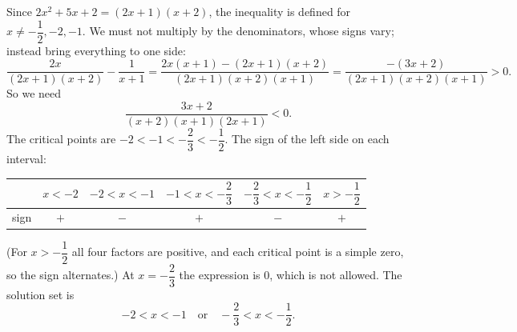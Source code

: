 Since $2x^2+5x+2=(2x+1)(x+2)$, the inequality is defined for $x\ne-\dfrac12,-2,-1$. We must not multiply by the denominators, whose signs vary; instead bring everything to one side:
\[\dfrac{2x}{(2x+1)(x+2)}-\dfrac1{x+1}=\dfrac{2x(x+1)-(2x+1)(x+2)}{(2x+1)(x+2)(x+1)}=\dfrac{-(3x+2)}{(2x+1)(x+2)(x+1)}>0.\]
So we need
\[\dfrac{3x+2}{(x+2)(x+1)(2x+1)}<0.\]
The critical points are $-2<-1<-\dfrac23<-\dfrac12$. The sign of the left side on each interval:
\begin{center}
\begin{tabular}{c|c|c|c|c|c}
& $x<-2$ & $-2<x<-1$ & $-1<x<-\dfrac23$ & $-\dfrac23<x<-\dfrac12$ & $x>-\dfrac12$\\ \hline
sign & $+$ & $-$ & $+$ & $-$ & $+$
\end{tabular}
\end{center}
(For $x>-\dfrac12$ all four factors are positive, and each critical point is a simple zero, so the sign alternates.) At $x=-\dfrac23$ the expression is $0$, which is not allowed. The solution set is
\[\boxed{-2<x<-1\quad\text{or}\quad-\dfrac23<x<-\dfrac12}.\]
